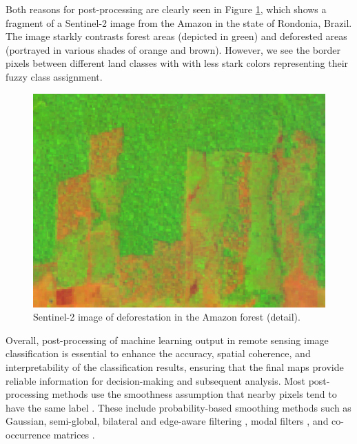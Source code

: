 \documentclass[
  shortnames]{jss}
\begin{document}
Both reasons for post-processing are clearly seen in Figure \ref{fig:roim}, which shows a fragment of a Sentinel-2 image from the Amazon in the state of Rondonia, Brazil. The image starkly contrasts forest areas (depicted in green) and deforested areas (portrayed in various shades of orange and brown). However, we see the border pixels between different land classes with with less stark colors representing their fuzzy class assignment.

\begin{CodeChunk}
\begin{figure}[h]

{\centering \includegraphics[width=4.6in]{images/rondonia_image} 

}

\caption[Sentinel-2 image of deforestation in the Amazon forest (detail)]{Sentinel-2 image of deforestation in the Amazon forest (detail).}\label{fig:roim}
\end{figure}
\end{CodeChunk}

Overall, post-processing of machine learning output in remote sensing image classification is essential to enhance the accuracy, spatial coherence, and interpretability of the classification results, ensuring that the final maps provide reliable information for decision-making and subsequent analysis. Most post-processing methods use the smoothness assumption that nearby pixels tend to have the same label \citep{Schindler2012}. These include probability-based smoothing methods such as Gaussian, semi-global, bilateral and edge-aware filtering \citep{Schindler2012}, modal filters \citep{Ghimire2010}, and co-occurrence matrices \citep{Huang2014}.
\end{document}
